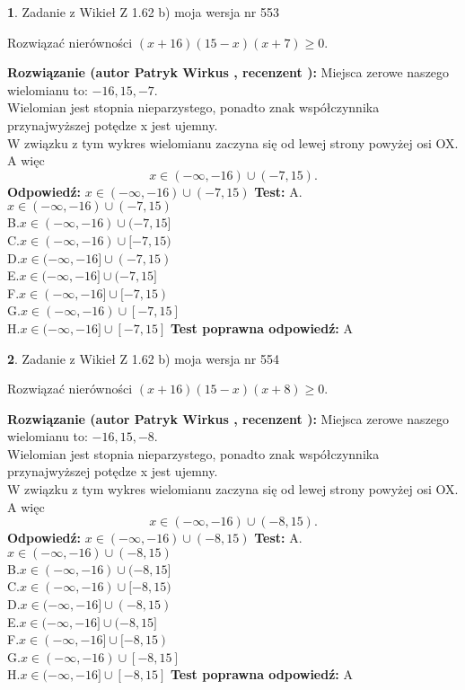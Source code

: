 \documentclass[12pt, a4paper]{article}
\theoremstyle{definition} %
\newtheorem{zad}{}
\newcommand{\zadStart}[1]{\begin{zad}#1\newline}
\newcommand{\zadStop}{\end{zad}}
\newcommand{\rozwStart}[2]{\noindent \textbf{Rozwiązanie (autor #1 , recenzent #2): }\newline}
\newcommand{\rozwStop}{\newline}
\newcommand{\odpStart}{\noindent \textbf{Odpowiedź:}\newline}
\newcommand{\odpStop}{\newline}
\newcommand{\testStart}{\noindent \textbf{Test:}\newline}
\newcommand{\testStop}{\newline}
\newcommand{\kluczStart}{\noindent \textbf{Test poprawna odpowiedź:}\newline}
\newcommand{\kluczStop}{\newline}
\begin{document}
\zadStart{Zadanie z Wikieł Z 1.62 b) moja wersja nr 553}

Rozwiązać nierówności $(x+16)(15-x)(x+7)\ge0$.
\zadStop
\rozwStart{Patryk Wirkus}{}
Miejsca zerowe naszego wielomianu to: $-16, 15, -7$.\\
Wielomian jest stopnia nieparzystego, ponadto znak współczynnika przy\linebreak najwyższej potędze x jest ujemny.\\ W związku z tym wykres wielomianu zaczyna się od lewej strony powyżej osi OX. A więc $$x \in (-\infty,-16) \cup (-7,15).$$
\rozwStop
\odpStart
$x \in (-\infty,-16) \cup (-7,15)$
\odpStop
\testStart
A.$x \in (-\infty,-16) \cup (-7,15)$\\
B.$x \in (-\infty,-16) \cup (-7,15]$\\
C.$x \in (-\infty,-16) \cup [-7,15)$\\
D.$x \in (-\infty,-16] \cup (-7,15)$\\
E.$x \in (-\infty,-16] \cup (-7,15]$\\
F.$x \in (-\infty,-16] \cup [-7,15)$\\
G.$x \in (-\infty,-16) \cup [-7,15]$\\
H.$x \in (-\infty,-16] \cup [-7,15]$
\testStop
\kluczStart
A
\kluczStop



\zadStart{Zadanie z Wikieł Z 1.62 b) moja wersja nr 554}

Rozwiązać nierówności $(x+16)(15-x)(x+8)\ge0$.
\zadStop
\rozwStart{Patryk Wirkus}{}
Miejsca zerowe naszego wielomianu to: $-16, 15, -8$.\\
Wielomian jest stopnia nieparzystego, ponadto znak współczynnika przy\linebreak najwyższej potędze x jest ujemny.\\ W związku z tym wykres wielomianu zaczyna się od lewej strony powyżej osi OX. A więc $$x \in (-\infty,-16) \cup (-8,15).$$
\rozwStop
\odpStart
$x \in (-\infty,-16) \cup (-8,15)$
\odpStop
\testStart
A.$x \in (-\infty,-16) \cup (-8,15)$\\
B.$x \in (-\infty,-16) \cup (-8,15]$\\
C.$x \in (-\infty,-16) \cup [-8,15)$\\
D.$x \in (-\infty,-16] \cup (-8,15)$\\
E.$x \in (-\infty,-16] \cup (-8,15]$\\
F.$x \in (-\infty,-16] \cup [-8,15)$\\
G.$x \in (-\infty,-16) \cup [-8,15]$\\
H.$x \in (-\infty,-16] \cup [-8,15]$
\testStop
\kluczStart
A
\kluczStop
\end{document}
